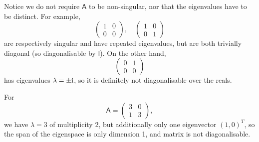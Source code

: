 \documentclass[letter-paper]{tufte-book}
\newenvironment{example}[1][Example]{\begin{trivlist}
\item[\hskip \labelsep {\bfseries #1}]}{\end{trivlist}}
\newcommand{\zi}{{\rm i}}
\begin{document}
Notice we do not require $\mathsf{A}$ to be non-singular, nor that the
eigenvalues have to be distinct. For example,
\begin{equation*}
  \begin{pmatrix}1 & 0 \\ 0 & 0\end{pmatrix}, \quad \begin{pmatrix}1 & 0 \\ 0 & 1\end{pmatrix}
\end{equation*}
are respectively singular and have repeated eigenvalues, but are both trivially
diagonal (so diagonalisable by $\mathsf{I}$). On the other hand,
\begin{equation*}
  \begin{pmatrix}0 & 1 \\ 0 & 0\end{pmatrix}
\end{equation*}
has eigenvalues $\lambda = \pm \zi$, so it is definitely not diagonalisable over
the reals.

\begin{example}
  For
  \begin{equation*}
    \mathsf{A} = \begin{pmatrix}3 & 0 \\ 1 & 3\end{pmatrix},
  \end{equation*}
  we have $\lambda=3$ of multiplicity 2, but additionally only one eigenvector
  $(1,0)^T$, so the span of the eigenspace is only dimension 1, and matrix is
  not diagonalisable.
\end{example}
\end{document}
